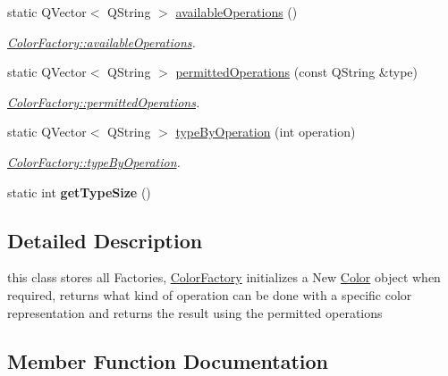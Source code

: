 \begin{DoxyCompactItemize}
static Q\+Vector$<$ Q\+String $>$ \hyperlink{class_color_factory_a9dc30325232e3cf63276ed8f9c2d6ab1}{available\+Operations} ()
\begin{DoxyCompactList}\small\item\em \hyperlink{class_color_factory_a9dc30325232e3cf63276ed8f9c2d6ab1}{Color\+Factory\+::available\+Operations}. \end{DoxyCompactList}\item 
static Q\+Vector$<$ Q\+String $>$ \hyperlink{class_color_factory_a4a6862d52370ea64981f1842dfa6c4f2}{permitted\+Operations} (const Q\+String \&type)
\begin{DoxyCompactList}\small\item\em \hyperlink{class_color_factory_a4a6862d52370ea64981f1842dfa6c4f2}{Color\+Factory\+::permitted\+Operations}. \end{DoxyCompactList}\item 
static Q\+Vector$<$ Q\+String $>$ \hyperlink{class_color_factory_a460165d3cd7b710b4f8731a5e56d8c35}{type\+By\+Operation} (int operation)
\begin{DoxyCompactList}\small\item\em \hyperlink{class_color_factory_a460165d3cd7b710b4f8731a5e56d8c35}{Color\+Factory\+::type\+By\+Operation}. \end{DoxyCompactList}\item 
\mbox{\label{class_color_factory_a08c21c5ec305802deb7d610ff0a66ef7}} 
static int {\bfseries get\+Type\+Size} ()
\end{DoxyCompactItemize}


\subsection{Detailed Description}
this class stores all Factories, \hyperlink{class_color_factory}{Color\+Factory} initializes a New \hyperlink{class_color}{Color} object when required, returns what kind of operation can be done with a specific color representation and returns the result using the permitted operations 

\subsection{Member Function Documentation}
\mbox{\label{class_color_factory_a16fd150054d514e72eaf6d5bf9e80fe2}} 
